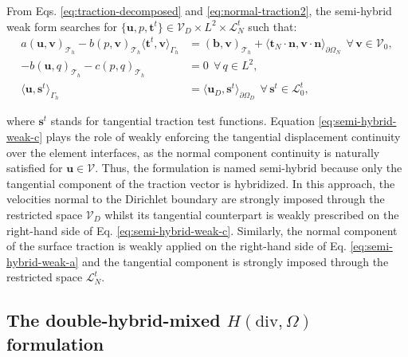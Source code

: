 \documentclass[english,11pt,3p,number,sort&compress]{elsarticle}
\begin{document}
From Eqs. \eqref{eq:traction-decomposed} and \eqref{eq:normal-traction2}, the semi-hybrid weak form searches for $\{\bm{u},p,\bm{t}^t\} \in \mathcal{V}_D \times L^2 \times \mathcal{L}^t_N$ such that:
\begin{subequations} \label{eq:semi-hybrid-weak}
	\begin{align}
		a\left(\bm{u},\bm{v}\right)_{\mathcal{T}_h} - b\left( p, \bm{v}\right)_{\mathcal{T}_h} \langle\bm{t}^t,\bm{v}\rangle_{\Gamma_h} &= \left(\bm{b},\bm{v}\right)_{\mathcal{T}_h} + \langle\bm{t}_N\cdot\bm{n},\bm{v}\cdot\bm{n}\rangle_{\partial\Omega_N} ~~\forall\, \bm{v} \in \mathcal{V}_0,\label{eq:semi-hybrid-weak-a}\\ 
		-b\left(\bm{u}, q\right)_{\mathcal{T}_h} - c\left(p,q \right)_{\mathcal{T}_h} &= 0 ~~\forall\, q \in L^2, \label{eq:semi-hybrid-weak-b}\\
		\langle\bm{u},\bm{s}^t\rangle_{\Gamma_h} &= \langle\bm{u}_D,\bm{s}^t\rangle_{\partial\Omega_D} ~~\forall\, \bm{s}^t \in \mathcal{L}^t_0, \label{eq:semi-hybrid-weak-c}
	\end{align}
\end{subequations}

\noindent where $\bm{s}^t$ stands for tangential traction test functions. Equation \eqref{eq:semi-hybrid-weak-c} plays the role of weakly enforcing the tangential displacement continuity over the element interfaces, as the normal component continuity is naturally satisfied for $\bm{u} \in \mathcal{V}$. Thus, the formulation is named semi-hybrid because only the tangential component of the traction vector is hybridized. In this approach, the velocities normal to the Dirichlet boundary are strongly imposed through the restricted space $\mathcal{V}_D$ whilst its tangential counterpart is weakly prescribed on the right-hand side of Eq. \eqref{eq:semi-hybrid-weak-c}. Similarly, the normal component of the surface traction is weakly applied on the right-hand side of Eq. \eqref{eq:semi-hybrid-weak-a} and the tangential component is strongly imposed through the restricted space $\mathcal{L}^t_N$.

\subsection{The double-hybrid-mixed \(H(\mathrm{div},\Omega)\) formulation}
\end{document}
